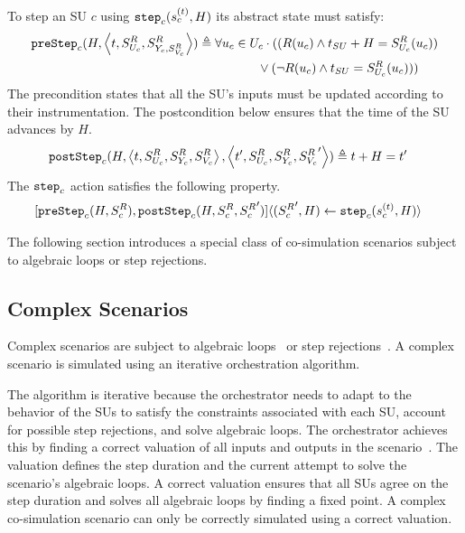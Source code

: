   \begin{definition}\label{def:step}
    To step an SU $c$ using $\mathtt{step}_{c}(s_{c}^{(t)}, H)$ its abstract state must satisfy:
    \begin{align*}
      &\mathtt{preStep}_{c}(H,  \left\langle t,S^{R}_{U_{c}}, S^{R}_{Y_{c}, S^{R}_{V_c}} \right\rangle ) \triangleq 
      \forall u_{c} \in U_{c}
      \cdot 
      ((R(u_{c}) \land t_{SU} + H = S^{R}_{U_{c}}(u_{c}))
      \nonumber \\
      &\qquad \qquad \qquad \qquad \qquad \qquad \qquad \qquad \qquad 
      \lor 
      (\neg R(u_{c}) \land t_{SU} = S^{R}_{U_{c}}(u_{c})))
    \end{align*}
    The precondition states that all the SU's inputs must be updated according to their instrumentation.  
    The postcondition below ensures that the time of the SU advances by $H$.
    \begin{align*}
      &\mathtt{postStep}_{c}(H,  \left\langle t,S^{R}_{U_{c}}, S^{R}_{Y_{c}}, S^{R}_{V_c} \right\rangle ,  \left\langle t',S^{R}_{U_{c}}, S^{R}_{Y_{c}}, {S^{R}_{V_c}}' \right\rangle ) \triangleq t + H = t'
    \end{align*}
    The $\mathtt{step}_{c}$ action satisfies the following property.
    \begin{align*}
      &[\mathtt{preStep}_{c}(H, S^{R}_{c}), 
      \mathtt{postStep}_{c}(H, S^{R}_{c}, {S^{R}_{c}}')] 
      \langle ({S^{R}_{c}}', H) \gets \mathtt{step}_{c}(s_{c}^{(t)},H) \rangle \nonumber
    \end{align*}
  \end{definition}

The following section introduces a special class of co-simulation scenarios subject to algebraic loops or step rejections.

\subsection{Complex Scenarios}
Complex scenarios are subject to algebraic loops~\cite{Kubler2000} or step rejections~\cite{thrane2021}.
A complex scenario is simulated using an iterative orchestration algorithm.

The algorithm is iterative because the orchestrator needs to adapt to the behavior of the SUs to satisfy the constraints associated with each SU, account for possible step rejections, and solve algebraic loops. 
The orchestrator achieves this by finding a correct valuation of all inputs and outputs in the scenario~\cite{thrane2021}.
The valuation defines the step duration and the current attempt to solve the scenario's algebraic loops. 
A correct valuation ensures that all SUs agree on the step duration and solves all algebraic loops by finding a fixed point.
A complex co-simulation scenario can only be correctly simulated using a correct valuation.

